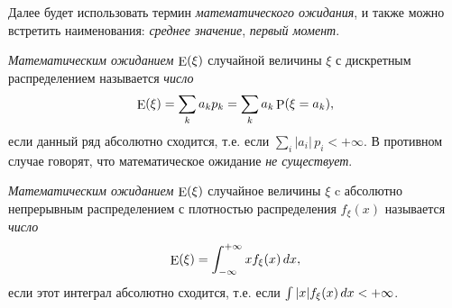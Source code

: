 Далее будет использовать термин \textit{математического ожидания}, и также можно встретить наименования: \textit{среднее значение}, \textit{первый момент}. 

\begin{to_def}
    \textit{Математическим ожиданием} 
    $\mathop{\mathrm{E}}\nolimits(\xi)$ случайной величины $\xi$ с дискретным распределением называется \textit{число}
    \begin{equation*}
        \mathop{\mathrm{E}}\nolimits (\xi) = \sum_k a_k p_k = \sum_k a_k \mathop{\mathrm{P}}\nolimits (\xi = a_k),
    \end{equation*}
    если данный ряд абсолютно сходится, т.е. если $\sum_i |a_i| \, p_i < +\infty$. В противном случае говорят, что математическое ожидание \textit{не существует}. 
\end{to_def}


\begin{to_def}
    \textit{Математическим ожиданием} $\mathop{\mathrm{E}}\nolimits (\xi)$ случайное величины $\xi$ c абсолютно непрерывным распределением с плотностью распределения $f_\xi (x)$ называется \textit{число}
    \begin{equation*}
        \mathop{\mathrm{E}}\nolimits (\xi) = \int_{-\infty}^{+\infty} 
        x f_\xi (x) \, d x,
    \end{equation*}
    если этот интеграл абсолютно сходится, т.е. если $\int |x| f_\xi (x) \, d x < + \infty$. 
\end{to_def}

